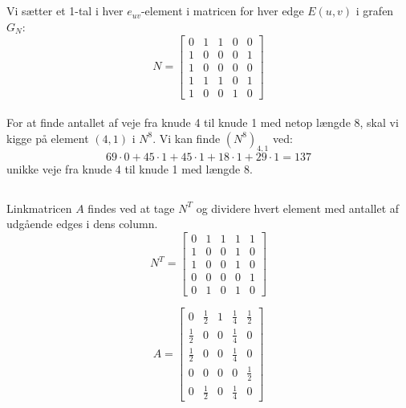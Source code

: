 \documentclass[a4paper,12pt]{article}
\begin{document}
\subsection{}
Vi sætter et 1-tal i hver $e_{uv}$-element i matricen for hver edge $E(u,v)$ i grafen $G_N$:\\

\[
N = 
\left[\begin{array}{ccccc}
    0 & 1 & 1 & 0 & 0 \\
    1 & 0 & 0 & 0 & 1 \\
    1 & 0 & 0 & 0 & 0 \\
    1 & 1 & 1 & 0 & 1 \\
    1 & 0 & 0 & 1 & 0 
\end{array}\right]
\]\\

For at finde antallet af veje fra knude 4 til knude 1 med netop længde 8, skal vi kigge på element $(4,1)$ i $N^8$. Vi kan finde $(N^8)_{4,1}$ ved:\\
\[
69 \cdot 0 + 45 \cdot 1 + 45 \cdot 1 + 18 \cdot 1 + 29 \cdot 1 = 137
\]
unikke veje fra knude 4 til knude 1 med længde 8.\\

\subsection{}
Linkmatricen $A$ findes ved at tage $N^T$ og dividere hvert element med antallet af udgående edges i dens column.\\
\[
N^T =
\left[\begin{array}{ccccc}
    0 & 1 & 1 & 1 & 1 \\
    1 & 0 & 0 & 1 & 0 \\
    1 & 0 & 0 & 1 & 0 \\
    0 & 0 & 0 & 0 & 1 \\
    0 & 1 & 0 & 1 & 0
\end{array}\right]
\]


\[
A =
\left[\begin{array}{ccccc}
    0 & \frac{1}{2} & 1 & \frac{1}{4} & \frac{1}{2} \\
    \frac{1}{2} & 0 & 0 & \frac{1}{4} & 0 \\
    \frac{1}{2} & 0 & 0 & \frac{1}{4} & 0 \\
    0 & 0 & 0 & 0 & \frac{1}{2} \\
    0 & \frac{1}{2} & 0 & \frac{1}{4} & 0
\end{array}\right]
\]
\end{document}
